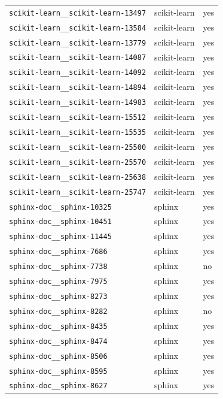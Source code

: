\begin{longtable}{@{}p{}lp{}@{}}
\texttt{scikit-learn\_\_scikit-learn-13497} & scikit-learn & yes \\
\texttt{scikit-learn\_\_scikit-learn-13584} & scikit-learn & yes \\
\texttt{scikit-learn\_\_scikit-learn-13779} & scikit-learn & yes \\
\texttt{scikit-learn\_\_scikit-learn-14087} & scikit-learn & yes \\
\texttt{scikit-learn\_\_scikit-learn-14092} & scikit-learn & yes \\
\texttt{scikit-learn\_\_scikit-learn-14894} & scikit-learn & yes \\
\texttt{scikit-learn\_\_scikit-learn-14983} & scikit-learn & yes \\
\texttt{scikit-learn\_\_scikit-learn-15512} & scikit-learn & yes \\
\texttt{scikit-learn\_\_scikit-learn-15535} & scikit-learn & yes \\
\texttt{scikit-learn\_\_scikit-learn-25500} & scikit-learn & yes \\
\texttt{scikit-learn\_\_scikit-learn-25570} & scikit-learn & yes \\
\texttt{scikit-learn\_\_scikit-learn-25638} & scikit-learn & yes \\
\texttt{scikit-learn\_\_scikit-learn-25747} & scikit-learn & yes \\
\texttt{sphinx-doc\_\_sphinx-10325} & sphinx & yes \\
\texttt{sphinx-doc\_\_sphinx-10451} & sphinx & yes \\
\texttt{sphinx-doc\_\_sphinx-11445} & sphinx & yes \\
\texttt{sphinx-doc\_\_sphinx-7686} & sphinx & yes \\
\texttt{sphinx-doc\_\_sphinx-7738} & sphinx & no \\
\texttt{sphinx-doc\_\_sphinx-7975} & sphinx & yes \\
\texttt{sphinx-doc\_\_sphinx-8273} & sphinx & yes \\
\texttt{sphinx-doc\_\_sphinx-8282} & sphinx & no \\
\texttt{sphinx-doc\_\_sphinx-8435} & sphinx & yes \\
\texttt{sphinx-doc\_\_sphinx-8474} & sphinx & yes \\
\texttt{sphinx-doc\_\_sphinx-8506} & sphinx & yes \\
\texttt{sphinx-doc\_\_sphinx-8595} & sphinx & yes \\
\texttt{sphinx-doc\_\_sphinx-8627} & sphinx & yes \\

\end{longtable}
